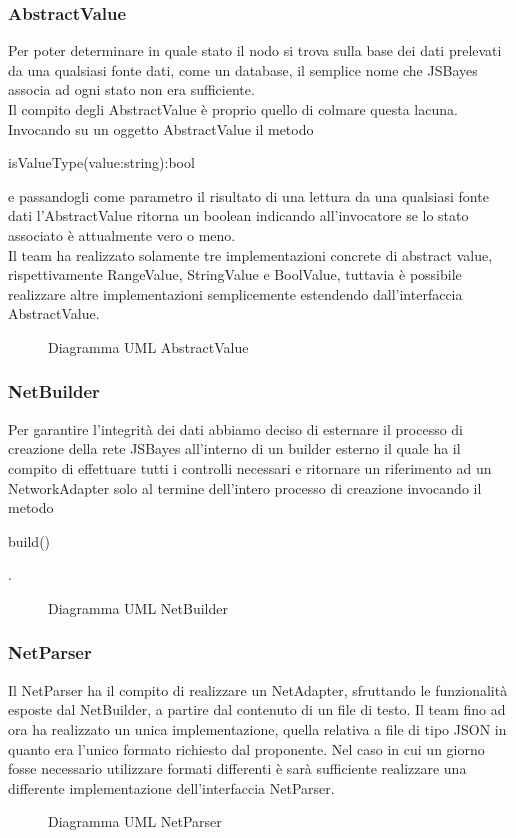 \subsubsection{AbstractValue}
Per poter determinare in quale stato il nodo si trova sulla base dei dati prelevati da una qualsiasi fonte dati, come un database, il semplice nome che JSBayes associa ad ogni stato non era sufficiente.\\
Il compito degli AbstractValue è proprio quello di colmare questa lacuna.
Invocando su un oggetto AbstractValue il metodo
\begin{ttfamily}
	isValueType(value:string):bool
\end{ttfamily}
e passandogli come parametro il risultato di una lettura da una qualsiasi fonte dati l'AbstractValue ritorna un boolean indicando all'invocatore se lo stato associato è attualmente vero o meno.\\
Il team ha realizzato solamente tre implementazioni concrete di abstract value, rispettivamente RangeValue, StringValue e BoolValue, tuttavia è possibile realizzare altre implementazioni semplicemente estendendo dall'interfaccia AbstractValue.
\begin{figure} [H]
	\centering
	
	\caption{Diagramma UML AbstractValue}\label{}
\end{figure}
\subsubsection{NetBuilder}
Per garantire l'integrità dei dati abbiamo deciso di esternare il processo di creazione della rete JSBayes all'interno di un builder esterno il quale ha il compito di effettuare tutti i controlli necessari e ritornare un riferimento ad un NetworkAdapter solo al termine dell'intero processo di creazione invocando il metodo
\begin{ttfamily}
	build()
\end{ttfamily}.
\begin{figure} [H]
	\centering
	
	\caption{Diagramma UML NetBuilder}\label{}
\end{figure}
\subsubsection{NetParser}
Il NetParser ha il compito di realizzare un NetAdapter, sfruttando le funzionalità esposte dal NetBuilder, a partire dal contenuto di un file di testo.
Il team fino ad ora ha realizzato un unica implementazione, quella relativa a file di tipo JSON in quanto era l'unico formato richiesto dal proponente.
Nel caso in cui un giorno fosse necessario utilizzare formati differenti è sarà sufficiente realizzare una differente implementazione dell'interfaccia NetParser.
\begin{figure} [H]
	\centering
	
	\caption{Diagramma UML NetParser}\label{}
\end{figure}
